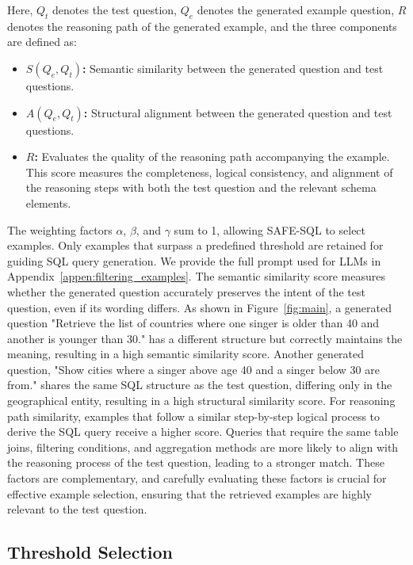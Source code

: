 Here, \( Q_t \) denotes the test question, \( Q_e \) denotes the generated example question, \( R \) denotes the reasoning path of the generated example, and the three components are defined as:
\begin{itemize}
    \item \textbf{\( S(Q_e, Q_t) \):} Semantic similarity between the generated question and test questions.
    \item \textbf{\( A(Q_e, Q_t) \):} Structural alignment between the generated question and test questions.
    \item \textbf{\( R \):} Evaluates the quality of the reasoning path accompanying the example. This score measures the completeness, logical consistency, and alignment of the reasoning steps with both the test question and the relevant schema elements.
\end{itemize}
The weighting factors $\alpha$, $\beta$, and $\gamma$ sum to 1, allowing SAFE-SQL to select examples. Only examples that surpass a predefined threshold are retained for guiding SQL query  generation. We provide the full prompt used for LLMs in Appendix~\ref{appen:filtering_examples}.
The semantic similarity score measures whether the generated question accurately preserves the intent of the test question, even if its wording differs. As shown in Figure~\ref{fig:main}, a generated question "Retrieve the list of countries where one singer is older than 40 and another is younger than 30." has a different structure but correctly maintains the meaning, resulting in a high semantic similarity score. Another generated question, "Show cities where a singer above age 40 and a singer below 30 are from." shares the same SQL structure as the test question, differing only in the geographical entity, resulting in a high structural similarity score. For reasoning path similarity, examples that follow a similar step-by-step logical process to derive the SQL query receive a higher score. Queries that require the same table joins, filtering conditions, and aggregation methods are more likely to align with the reasoning process of the test question, leading to a stronger match. These factors are complementary, and carefully evaluating these factors is crucial for effective example selection, ensuring that the retrieved examples are highly relevant to the test question. 
\subsection{Threshold Selection}




